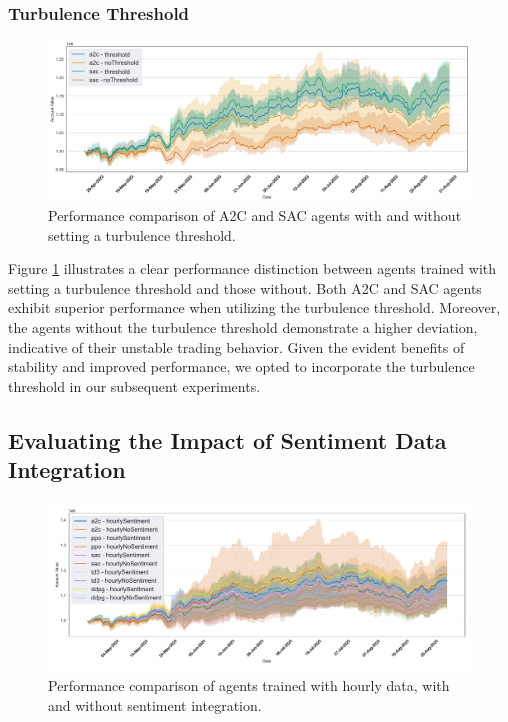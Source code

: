 \documentclass[12pt]{article}
\begin{document}
\subsubsection{Turbulence Threshold} 
\begin{figure}[h]
    \centering
    \includegraphics[width=1\textwidth]{figs/Hyperparameter_tuning/Compare_agents_performance_threshold_sac_a2c.jpg}
    \caption{Performance comparison of A2C and SAC agents with and without setting a turbulence threshold.}
    \label{fig:Compare_agents_performance_threshold_sac_a2c}
\end{figure}

Figure \ref{fig:Compare_agents_performance_threshold_sac_a2c} illustrates a clear performance distinction between agents trained with setting a turbulence threshold and those without. Both A2C and SAC agents exhibit superior performance when utilizing the turbulence threshold. Moreover, the agents without the turbulence threshold demonstrate a higher deviation, indicative of their unstable trading behavior. Given the evident benefits of stability and improved performance, we opted to incorporate the turbulence threshold in our subsequent experiments.

\subsection{Evaluating the Impact of Sentiment Data Integration}

\begin{figure}[h]
    \centering
    \includegraphics[width=1\textwidth]{figs/Models_comparison/Compare_agent_performance_hourlySentiment_a2c_ppo_sac_td3_ddpg.pdf}
    \caption{Performance comparison of agents trained with hourly data, with and without sentiment integration.}
    \label{fig:Compare_agent_performance_hourlySentiment_a2c_ppo_sac_td3_ddpg}
\end{figure}
\end{document}

